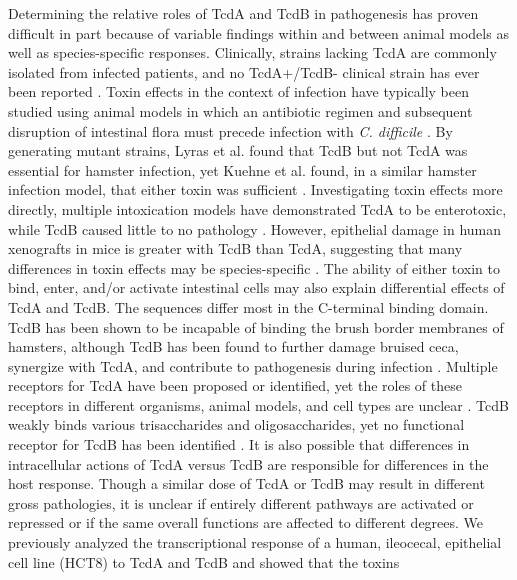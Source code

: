 Determining the relative roles of TcdA and TcdB in pathogenesis has 
proven difficult in part because of variable findings within and 
between animal models as well as species-specific responses. Clinically, 
strains lacking TcdA are commonly isolated from infected patients, and 
no TcdA+/TcdB- clinical strain has ever been reported \cite{Drudy:2007fa}. 
Toxin effects in the context of infection have typically been studied 
using animal models in which an antibiotic regimen and subsequent 
disruption of intestinal flora must precede infection with 
\textit{C. difficile} \cite{Small:1968ux,Bartlett:1977wr}. By generating 
mutant strains, Lyras et al. found that TcdB but not TcdA was 
essential for hamster infection, yet Kuehne et al. found, in a 
similar hamster infection model, that either toxin was sufficient 
\cite{Lyras:2009jx,Kuehne:2010hv}. Investigating toxin effects 
more directly, multiple intoxication models have demonstrated 
TcdA to be enterotoxic, while TcdB caused little to no pathology 
\cite{Libby:1982wm,Taylor:1981ud,Lyerly:1985dx}. However, epithelial 
damage in human xenografts in mice is greater with TcdB than TcdA, 
suggesting that many differences in toxin effects may be species-specific 
\cite{Savidge:2003ck}. The ability of either toxin to bind, enter, 
and/or activate intestinal cells may also explain differential 
effects of TcdA and TcdB. The sequences differ most in the C-terminal 
binding domain. TcdB has been shown to be incapable of binding the 
brush border membranes of hamsters, although TcdB has been found to 
further damage bruised ceca, synergize with TcdA, and contribute to 
pathogenesis during infection \cite{Lyras:2009jx,Lyerly:1985dx,Rolfe:1991vx}. 
Multiple receptors for TcdA have been proposed or identified, yet the 
roles of these receptors in different organisms, animal models, and 
cell types are unclear 
\cite{Krivan:1986tq,Tucker:1991uk,Rolfe:1995wl,Pothoulakis:1996ba,Pothoulakis:1996kd,Na:2008eu}. 
TcdB weakly binds various trisaccharides and oligosaccharides, yet 
no functional receptor for TcdB has been identified \cite{ElHawiet:2011ep}. 
It is also possible that differences in intracellular actions of TcdA 
versus TcdB are responsible for differences in the host response. Though 
a similar dose of TcdA or TcdB may result in different gross pathologies, 
it is unclear if entirely different pathways are activated or repressed 
or if the same overall functions are affected to different degrees. We 
previously analyzed the transcriptional response of a human, ileocecal, 
epithelial cell line (HCT8) to TcdA and TcdB and showed that the toxins 
